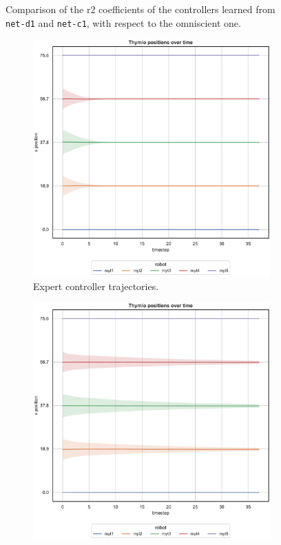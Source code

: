 \begin{figure}[!htb]
\begin{center}
\begin{subfigure}[h]{0.49\textwidth}
		\end{subfigure}
	\end{center}
	\caption[Evaluation of the \gls{r2} coefficients of \texttt{net-c1}.]{Comparison 
		of the \gls{r2} coefficients of the controllers learned from \texttt{net-d1} and 
		\texttt{net-c1}, with respect to the omniscient one.}
	\label{fig:net-c1r2}
\end{figure}
\begin{figure}[H]
	\begin{center}
		\begin{subfigure}[h]{0.49\textwidth}
			\centering
			\includegraphics[width=.9\textwidth]{contents/images/net-d1/position-overtime-omniscient}%
			\caption{Expert controller trajectories.}
		\end{subfigure}
		\hfill
		\begin{subfigure}[h]{0.49\textwidth}
			\centering
			\includegraphics[width=.9\textwidth]{contents/images/net-d1/position-overtime-learned_distributed}

\end{subfigure}
\end{center}
\end{figure}
